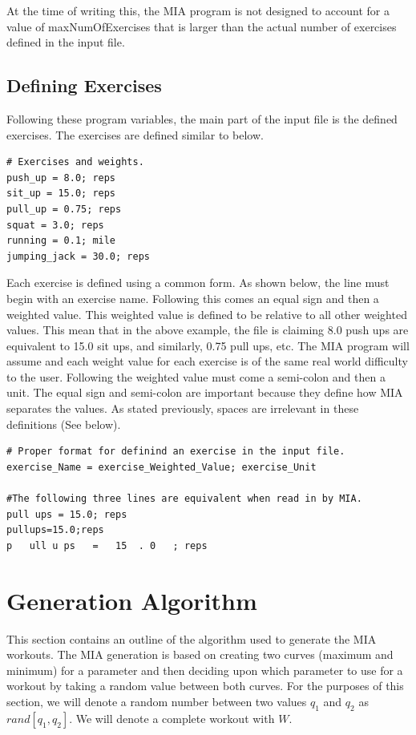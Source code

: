 \begin{note}
	At the time of writing this, the MIA program is not designed to account for a value of maxNumOfExercises that is larger than the actual number of exercises defined in the input file.
\end{note}

\subsection{Defining Exercises}

Following these program variables, the main part of the input file is the defined exercises. The exercises are defined similar to below.

\begin{lstlisting}
# Exercises and weights.
push_up = 8.0; reps
sit_up = 15.0; reps
pull_up = 0.75; reps
squat = 3.0; reps
running = 0.1; mile
jumping_jack = 30.0; reps
\end{lstlisting}

Each exercise is defined using a common form. As shown below, the line must begin with an exercise name. Following this comes an equal sign and then a weighted value. This weighted value is defined to be relative to all other weighted values. This mean that in the above example, the file is claiming 8.0 push ups are equivalent to 15.0 sit ups, and similarly, 0.75 pull ups, etc. The MIA program will assume and each weight value for each exercise is of the same real world difficulty to the user. Following the weighted value must come a semi-colon and then a unit. The equal sign and semi-colon are important because they define how MIA separates the values. As stated previously, spaces are irrelevant in these definitions (See below).

\begin{lstlisting}
# Proper format for definind an exercise in the input file.
exercise_Name = exercise_Weighted_Value; exercise_Unit

#The following three lines are equivalent when read in by MIA.
pull ups = 15.0; reps
pullups=15.0;reps
p   ull u ps   =   15  . 0   ; reps
\end{lstlisting}


\section{Generation Algorithm}\label{workout algorithm}

This section contains an outline of the algorithm used to generate the MIA workouts. The MIA generation is based on creating two curves (maximum and minimum) for a parameter and then deciding upon which parameter to use for a workout by taking a random value between both curves. For the purposes of this section, we will denote a random number between two values $q_1$ and $q_2$ as $rand[q_1,q_2]$. We will denote a complete workout with $W$.

